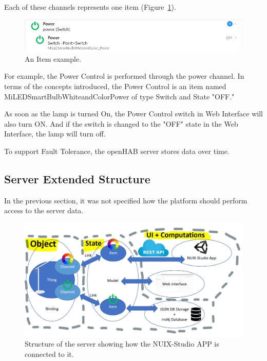Each of these channels represents one item (Figure~\ref{fig:XiaomiLampPowerItem-figure}).

\begin{figure}
  \centering
  \includegraphics[width=0.9\linewidth]{figures/XiaomiLampPowerItem.png}
  \caption{An Item example.}
  \label{fig:XiaomiLampPowerItem-figure}
\end{figure}

For example, the Power Control is performed through the power channel. In terms of the concepts introduced, the Power Control is an item named MiLEDSmartBulbWhiteandColorPower of type Switch and State "OFF."

As soon as the lamp is turned On, the Power Control switch in Web Interface will also turn ON. And if the switch is changed to the "OFF" state in the Web Interface, the lamp will turn off.

To support Fault Tolerance, the openHAB server stores data over time.

\subsection{Server Extended Structure}

In the previous section, it was not specified how the platform should perform access to the server data. 

\begin{figure}
  \centering
  \includegraphics[width=0.9\linewidth]{figures/ExtendedServerStructure.png}
  \caption{Structure of the server showing how the NUIX-Studio APP is connected to it.}
  \label{fig:ExtendedServerStructure-figure}
\end{figure}

